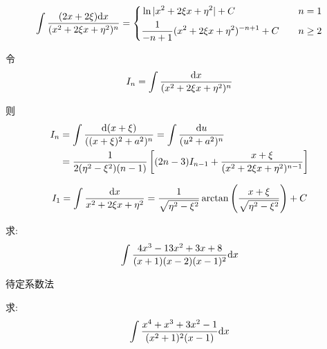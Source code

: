 \begin{equation*}
    \int\frac{(2x+2\xi)\mathrm{d} x}{(x^2+2\xi x+\eta^2)^n} = \left\{
        \begin{aligned}
            &\ln|x^2+2\xi x +\eta^2| + C & \quad n = 1 \\
            &\frac{1}{-n+1}(x^2+2\xi x + \eta^2)^{-n+1} + C & \quad n \ge 2
        \end{aligned}
    \right.
\end{equation*}

令
\begin{equation*}
    I_n = \int \frac{\mathrm{d} x}{(x^2+2\xi x + \eta^2)^n}
\end{equation*}

则
\begin{equation*}
    \begin{aligned}
        I_n &= \int \frac{\mathrm{d} (x+\xi)}{((x+\xi)^2+a^2)^n} = \int\frac{\mathrm{d} u}{(u^2+a^2)^n} \\
        &= \frac{1}{2(\eta^2-\xi^2)(n-1)}\left[(2n-3)I_{n-1}+\frac{x+\xi}{(x^2+2\xi x+\eta^2)^{n-1}}\right]
    \end{aligned}
\end{equation*}

\begin{equation*}
    I_1 = \int\frac{\mathrm{d} x}{x^2+2\xi x+\eta^2} = \frac{1}{\sqrt{\eta^2-\xi^2}}\arctan\left(\frac{x+\xi}{\sqrt{\eta^2-\xi^2}}\right) + C
\end{equation*}

\begin{example}
    求:
    \begin{equation*}
        \int \frac{4x^3-13x^2+3x+8}{(x+1)(x-2)(x-1)^2} \mathrm{d} x
    \end{equation*}
\end{example}
\begin{solution}
    
\end{solution}
\begin{remark}
    待定系数法
\end{remark}

\begin{example}
    求:
    \begin{equation}
        \int \frac{x^4+x^3+3x^2-1}{(x^2+1)^2(x-1)} \mathrm{d} x
    \end{equation}
\end{example}
\begin{solution}
    
\end{solution}
